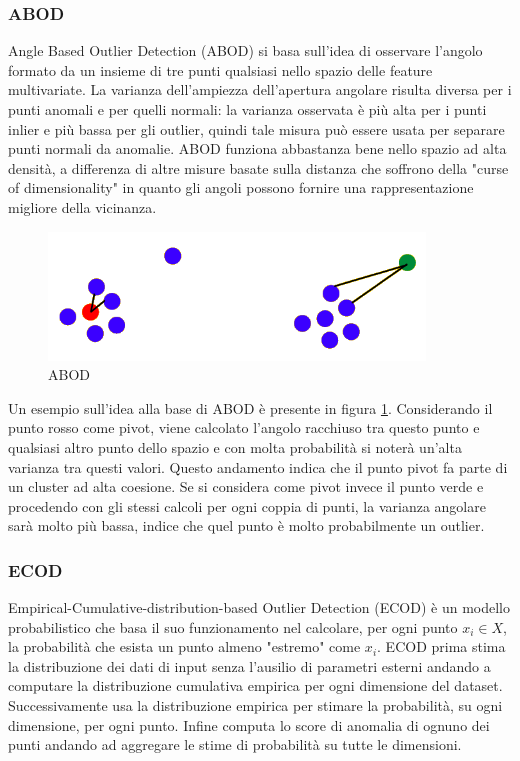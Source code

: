 \subsubsection{ABOD}
Angle Based Outlier Detection (ABOD) si basa sull'idea di osservare l'angolo formato da un insieme di tre punti qualsiasi nello spazio delle feature multivariate. La varianza dell'ampiezza dell'apertura angolare risulta diversa per i punti anomali e per quelli normali: la varianza osservata è più alta per i punti inlier e più bassa per gli outlier, quindi tale misura può essere usata per separare punti normali da anomalie. ABOD funziona abbastanza bene nello spazio ad alta densità, a differenza di altre misure basate sulla distanza che soffrono della "curse of dimensionality" in quanto gli angoli possono fornire una rappresentazione migliore della vicinanza.
\begin{figure}[t]
	\centering
	\includegraphics[width=10cm, scale=1]{images/abod}
	\caption{ABOD}
	\label{abod}
\end{figure}
Un esempio sull'idea alla base di ABOD è presente in figura \ref{abod}.
Considerando il punto rosso come pivot, viene calcolato l'angolo racchiuso tra questo punto e qualsiasi altro punto dello spazio e con molta probabilità si noterà un'alta varianza tra questi valori. Questo andamento indica che il punto pivot fa parte di un cluster ad alta coesione.
Se si considera come pivot invece il punto verde e procedendo con gli stessi calcoli per ogni coppia di punti, la varianza angolare sarà molto più bassa, indice che quel punto è molto probabilmente un outlier.

\subsubsection{ECOD}
Empirical-Cumulative-distribution-based Outlier Detection (ECOD) è un modello probabilistico che basa il suo funzionamento nel calcolare, per ogni punto $x_i \in X$, la probabilità che esista un punto almeno "estremo" come $x_i$.
ECOD prima stima la distribuzione dei dati di input senza l'ausilio di parametri esterni andando a computare la distribuzione cumulativa empirica per ogni dimensione del dataset. Successivamente usa la distribuzione empirica per stimare la probabilità, su ogni dimensione, per ogni punto. Infine computa lo score di anomalia di ognuno dei punti andando ad aggregare le stime di probabilità su tutte le dimensioni.

